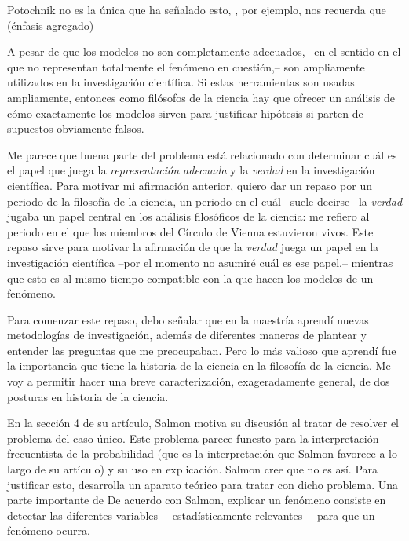 Potochnik no es la única que ha señalado esto,
\textcite[][p.24]{abrams2023evolution}, por ejemplo, nos recuerda que
 (énfasis agregado)

A pesar de que los modelos no son completamente adecuados, --en el
sentido en el que no representan totalmente el fenómeno en
cuestión,-- son ampliamente utilizados en la investigación
científica. Si estas herramientas son usadas ampliamente, entonces
como filósofos de la ciencia hay que ofrecer un análisis de cómo
exactamente los modelos sirven para justificar hipótesis si parten de
supuestos obviamente falsos.

Me parece que buena parte del problema está relacionado con
determinar cuál es el papel que juega la \emph{representación
	adecuada} y la \emph{verdad} en la investigación científica. Para
motivar mi afirmación anterior, quiero dar un repaso por un periodo
de la filosofía de la ciencia, un periodo en el cuál --suele
decirse-- la \emph{verdad} jugaba un papel central en los análisis
filosóficos de la ciencia: me refiero al periodo en el que los
miembros del Círculo de Vienna estuvieron vivos. Este repaso sirve
para motivar la afirmación de que la \emph{verdad} juega un papel en
la investigación científica --por el momento no asumiré cuál es ese
papel,-- mientras que esto es al mismo tiempo compatible con la
 que hacen los modelos de un fenómeno.

Para comenzar este repaso, debo señalar que en la maestría aprendí
nuevas metodologías de investigación, además de diferentes maneras de
plantear y entender las preguntas que me preocupaban. Pero lo más
valioso que aprendí fue la importancia que tiene la historia de la
ciencia en la filosofía de la ciencia. Me voy a permitir hacer una
breve caracterización, exageradamente general, de dos posturas en
historia de la ciencia.

En la sección 4 de su artículo, Salmon motiva su discusión al tratar
de resolver el problema del caso único. Este problema parece funesto
para la interpretación frecuentista de la probabilidad (que es la
interpretación que Salmon favorece a lo largo de su artículo) y su
uso en explicación. Salmon cree que no es así. Para justificar esto,
desarrolla un aparato teórico para tratar con dicho problema. Una
parte importante de De acuerdo con Salmon, explicar un fenómeno
consiste en detectar las diferentes variables ---estadísticamente
relevantes--- para que un fenómeno ocurra.
